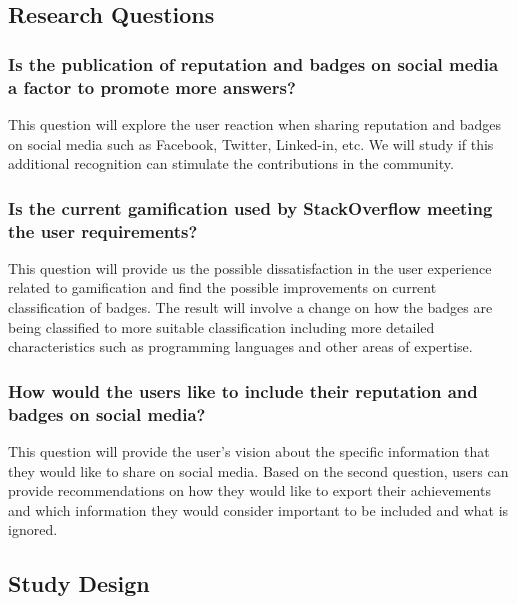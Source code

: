 \documentclass{sigchi}
\begin{document}
\subsection{Research Questions}

\subsubsection{Is the publication of reputation and badges on social media a
factor to promote more answers?}

This question will explore the user reaction when sharing reputation and badges
on social media such as Facebook, Twitter, Linked-in, etc. We will study if this
additional recognition can stimulate the contributions in the community.


\subsubsection{Is the current gamification used by StackOverflow meeting the
user requirements?}

This question will provide us the possible dissatisfaction in the user
experience related to gamification and find the possible improvements on
current classification of badges. The result will involve a change on how the
badges are being classified to more suitable classification including more
detailed characteristics such as programming languages and other areas of expertise.

\subsubsection{How would the users like to include their reputation and badges
on social media?}

This question will provide the user’s vision about the specific information
that they would like to share on social media. Based on the second question,
users can provide recommendations on how they would like to export their
achievements and which information they would consider important to be
included and what is ignored.


\subsection{Study Design}
\end{document}
